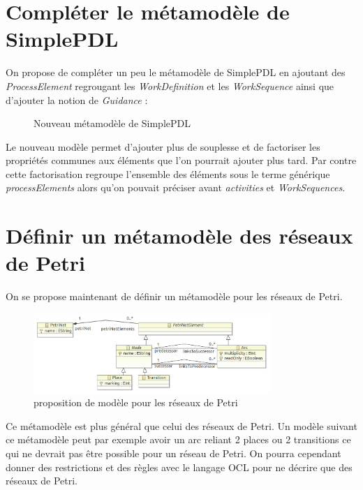 \section{Compléter le métamodèle de SimplePDL}

On propose de compléter un peu le métamodèle de SimplePDL en ajoutant des \textit{ProcessElement} regrougant les \textit{WorkDefinition} et les \textit{WorkSequence} ainsi que d'ajouter la notion de \textit{Guidance} :

\begin{figure}[h]
   \centering
   \caption{Nouveau métamodèle de SimplePDL}
   \label{pdlv2}
\end{figure}

Le nouveau modèle permet d'ajouter plus de souplesse et de factoriser les propriétés communes aux éléments que l'on pourrait ajouter plus tard. Par contre cette factorisation regroupe l'ensemble des éléments sous le terme générique \textit{processElements} alors qu'on pouvait préciser avant \textit{activities} et \textit{WorkSequences}.

\section{Définir un métamodèle des réseaux de Petri}

On se propose maintenant de définir un métamodèle pour les réseaux de Petri.

\begin{figure}[h]
   \centering
   \includegraphics[width = 0.8\textwidth]{../Images/tp2/tp2_4.png}
   \caption{proposition de modèle pour les réseaux de Petri}
   \label{petriModel}
\end{figure}

Ce métamodèle est plus général que celui des réseaux de Petri. Un modèle suivant ce métamodèle peut par exemple avoir un arc reliant 2 places ou 2 transitions ce qui ne devrait pas être possible pour un réseau de Petri. On pourra cependant donner des restrictions et des règles avec le langage OCL pour ne décrire que des réseaux de Petri.
